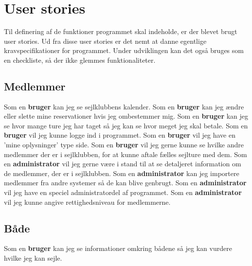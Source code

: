 \chapter{User stories}\label{User_stories}
Til definering af de funktioner programmet skal indeholde, er der blevet brugt user stories.
Ud fra disse user stories er det nemt at danne egentlige kravspecifikationer for programmet. 
Under udviklingen kan det også bruges som en checkliste, så der ikke glemmes funktionaliteter. 

\section{Medlemmer}
Som en \textbf{bruger} kan jeg se sejlklubbens kalender.
\newline
Som en \textbf{bruger} kan jeg ændre eller slette mine reservationer hvis jeg ombestemmer mig.
\newline
Som en \textbf{bruger} kan jeg se hvor mange ture jeg har taget så jeg kan se hvor meget jeg skal betale.
\newline
Som en \textbf{bruger} vil jeg kunne logge ind i programmet.
\newline
Som en \textbf{bruger} vil jeg have en 'mine oplysninger' type side. 
\newline
Som en \textbf{bruger} vil jeg gerne kunne se hvilke andre medlemmer der er i sejlklubben, for at kunne aftale fælles sejlture med dem.
\newline
Som en \textbf{administrator} vil jeg gerne være i stand til at se detaljeret information om de medlemmer, der er i sejlklubben.
\newline
Som en \textbf{administrator} kan jeg importere medlemmer fra andre systemer så de kan blive genbrugt.
\newline
Som en \textbf{administrator} vil jeg have en speciel administratordel af programmet.
\newline
Som en \textbf{administrator} vil jeg kunne angive rettighedsniveau for medlemmerne.

\section{Både}

Som en \textbf{bruger} kan jeg se informationer omkring bådene så jeg kan vurdere hvilke jeg kan sejle.


